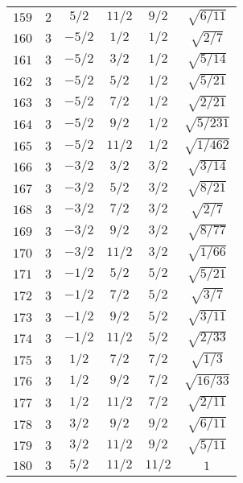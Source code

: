 \begin{table}
\begin{center}
\begin{tabular}{|c|c|c|c|c|c|}
$159$ & $2$ & $5/2$ & $11/2$ & $9/2$ & $\sqrt{6/11}$ \\ 
$160$ & $3$ & $-5/2$ & $1/2$ & $1/2$ & $\sqrt{2/7}$ \\ 
$161$ & $3$ & $-5/2$ & $3/2$ & $1/2$ & $\sqrt{5/14}$ \\ 
$162$ & $3$ & $-5/2$ & $5/2$ & $1/2$ & $\sqrt{5/21}$ \\ 
$163$ & $3$ & $-5/2$ & $7/2$ & $1/2$ & $\sqrt{2/21}$ \\ 
$164$ & $3$ & $-5/2$ & $9/2$ & $1/2$ & $\sqrt{5/231}$ \\ 
$165$ & $3$ & $-5/2$ & $11/2$ & $1/2$ & $\sqrt{1/462}$ \\ 
$166$ & $3$ & $-3/2$ & $3/2$ & $3/2$ & $\sqrt{3/14}$ \\ 
$167$ & $3$ & $-3/2$ & $5/2$ & $3/2$ & $\sqrt{8/21}$ \\ 
$168$ & $3$ & $-3/2$ & $7/2$ & $3/2$ & $\sqrt{2/7}$ \\ 
$169$ & $3$ & $-3/2$ & $9/2$ & $3/2$ & $\sqrt{8/77}$ \\ 
$170$ & $3$ & $-3/2$ & $11/2$ & $3/2$ & $\sqrt{1/66}$ \\ 
$171$ & $3$ & $-1/2$ & $5/2$ & $5/2$ & $\sqrt{5/21}$ \\ 
$172$ & $3$ & $-1/2$ & $7/2$ & $5/2$ & $\sqrt{3/7}$ \\ 
$173$ & $3$ & $-1/2$ & $9/2$ & $5/2$ & $\sqrt{3/11}$ \\ 
$174$ & $3$ & $-1/2$ & $11/2$ & $5/2$ & $\sqrt{2/33}$ \\ 
$175$ & $3$ & $1/2$ & $7/2$ & $7/2$ & $\sqrt{1/3}$ \\ 
$176$ & $3$ & $1/2$ & $9/2$ & $7/2$ & $\sqrt{16/33}$ \\ 
$177$ & $3$ & $1/2$ & $11/2$ & $7/2$ & $\sqrt{2/11}$ \\ 
$178$ & $3$ & $3/2$ & $9/2$ & $9/2$ & $\sqrt{6/11}$ \\ 
$179$ & $3$ & $3/2$ & $11/2$ & $9/2$ & $\sqrt{5/11}$ \\ 
$180$ & $3$ & $5/2$ & $11/2$ & $11/2$ & $1$ \\ 
\hline 
\end{tabular}
\end{center}
\end{table}

